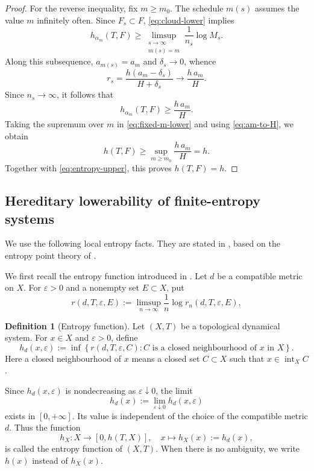 \documentclass[12pt,letterpaper,reqno]{amsart}
\theoremstyle{definition}
\newtheorem{definition}[theorem]{Definition}
\theoremstyle{remark}
\numberwithin{equation}{section}
\begin{document}
\begin{proof}
		For the reverse inequality, fix $m\geq m_0$.  The schedule $m(s)$ assumes
		the value $m$ infinitely often.  Since $F_s\subset F$, \eqref{eq:cloud-lower} implies
		\[
		h_{\alpha_m}(T,F)
		\geq
		\limsup_{\substack{s\to\infty\\m(s)=m}}
		\frac1{n_s}\log M_s.
		\]
		Along this subsequence, $a_{m(s)}=a_m$ and $\delta_s\to0$, whence
		\[
			r_s
			=
			\frac{h(a_m-\delta_s)}{H+\delta_s}
			\longrightarrow
			\frac{h\,a_m}{H}.
		\]
		Since $n_s\to\infty$, it follows that
		\begin{equation}
			h_{\alpha_m}(T,F)
			\geq
			\frac{h\,a_m}{H}.
			\label{eq:fixed-m-lower}
		\end{equation}
		Taking the supremum over $m$ in \eqref{eq:fixed-m-lower} and using
		\eqref{eq:am-to-H}, we obtain
		\[
		h(T,F)
		\geq
		\sup_{m\geq m_0}\frac{h\,a_m}{H}
		=h.
		\]
		Together with \eqref{eq:entropy-upper}, this proves $h(T,F)=h$.
	\end{proof}
	
	\subsection{Hereditary lowerability of finite-entropy systems}
	\label{sec:finite-systems}
	We use the following local entropy facts. They are stated in
	\cite[Theorem~5.1]{HYZ2010}, based on the entropy point theory of \cite{YeZhang2007}. 
	
	We first recall the entropy function introduced in
	\cite[Definition~4.1]{YeZhang2007}. Let $d$ be a compatible metric on $X$.
	For $\varepsilon>0$ and a nonempty set $E\subset X$, put
	\[
	r(d,T,\varepsilon,E)
	:=
	\limsup_{n\to\infty}
	\frac{1}{n}
	\log r_n(d,T,\varepsilon,E),
	\]
	\begin{definition}[Entropy function]
		\label{def:entropy-function}
		Let $(X,T)$ be a topological dynamical system. For $x\in X$ and
		$\varepsilon>0$, define
		\[
		h_d(x,\varepsilon)
		:=
		\inf
		\left\{
		r(d,T,\varepsilon,C):
		C\text{ is a closed neighbourhood of }x\text{ in }X
		\right\}.
		\]
		Here a closed neighbourhood of $x$ means a closed set $C\subset X$
		such that $x\in\operatorname{int}_X C$.
		
		Since $h_d(x,\varepsilon)$ is nondecreasing as
		$\varepsilon\downarrow0$, the limit
		\[
		h_d(x)
		:=
		\lim_{\varepsilon\downarrow0}h_d(x,\varepsilon)
		\]
		exists in $[0,+\infty]$. Its value is independent of the choice of the
		compatible metric $d$. Thus the function
		\[
		h_X\colon X\longrightarrow[0,h(T,X)],
		\quad
		x\longmapsto h_X(x):=h_d(x),
		\]
		is called the entropy function of $(X,T)$. When there is no ambiguity,
		we write $h(x)$ instead of $h_X(x)$.
	\end{definition}
	
\end{document}

